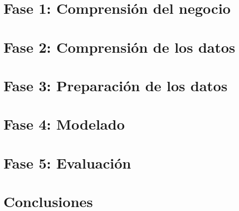 



	
	\newpage

	\tableofcontents
	\newpage
	\section{Fase 1: Comprensión del negocio}
		

	\newpage
	\section{Fase 2: Comprensión de los datos}
		

	\newpage
	\section{Fase 3: Preparación de los datos}
		

	\newpage
	\section{Fase 4: Modelado}
		

	\newpage
	\section{Fase 5: Evaluación}
		

	\newpage
	\section{Conclusiones}
		

